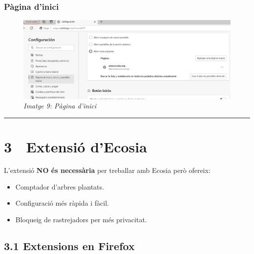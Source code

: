 \documentclass[
  a4paper,
]{article}
\providecommand{\tightlist}{%
  \setlength{\itemsep}{0pt}\setlength{\parskip}{0pt}}
\begin{document}
\subsubsection{Pàgina d'inici}\label{puxe0gina-dinici-2}

\begin{figure}
\centering
\includegraphics{png/2-EdgeInici.png}
\caption{\emph{Imatge 9: Pàgina d'inici}}
\end{figure}

\begin{center}\rule{0.5\linewidth}{0.5pt}\end{center}

\newpage

\section{3 🧩 Extensió d'Ecosia}\label{extensiuxf3-decosia}

L'extensió \textbf{NO és necessària} per treballar amb Ecosia però
ofereix:

\begin{itemize}
\tightlist
\item
  Comptador d'arbres plantats.
\item
  Configuració més ràpida i fàcil.
\item
  Bloqueig de rastrejadors per més privacitat.
\end{itemize}

\subsection{3.1 Extensions en Firefox}\label{extensions-en-firefox}
\end{document}
